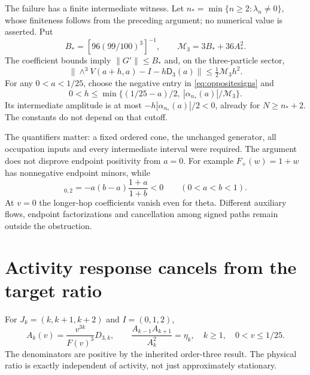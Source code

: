 \documentclass[11pt,letterpaper]{article}
\numberwithin{equation}{section}
\theoremstyle{remark}
\begin{document}
The failure has a finite intermediate witness. Let
$n_* =\min\{n\ge2:\lambda_n\ne0\}$, whose finiteness follows from the
preceding argument; no numerical value is asserted. Put
\begin{equation}
 B_*=[96(99/100)^3]^{-1},\qquad
 \mathcal M_3=3B_*+36A_*^2.
\end{equation}
The coefficient bounds imply $\|G'\|\le B_*$ and, on the three-particle
sector,
\[
 \|\wedge^3V(a+h,a)-I-h\mathsf D_3(a)\|
 \le\tfrac12\mathcal M_3h^2.
\]
For any $0<a<1/25$, choose the negative entry in
\eqref{eq:oppositesigns} and
\begin{equation}
 0<h\le\min\{(1/25-a)/2,\ |\alpha_{n_*}(a)|/\mathcal M_3\}.
 \label{eq:witness}
\end{equation}
Its intermediate amplitude is at most
$-h|\alpha_{n_*}(a)|/2<0$, already for $N\ge n_*+2$.
The constants do not depend on that cutoff.

The quantifiers matter: a fixed ordered cone, the unchanged generator,
all occupation inputs and every intermediate interval were required.
The argument does not disprove endpoint positivity from $a=0$.
For example $F_+(w)=1+w$ has nonnegative endpoint minors, while
\begin{equation}
 [K_bK_a^{-1}]_{0,2}
 =-a(b-a)\frac{1+a}{1+b}<0\qquad(0<a<b<1). \label{eq:bidiagonal}
\end{equation}
At $v=0$ the longer-hop coefficients vanish even for theta. Different
auxiliary flows, endpoint factorizations and cancellation among signed
paths remain outside the obstruction.

\section{Activity response cancels from the target ratio}
\label{sec:activity}
For $J_k=(k,k+1,k+2)$ and $I=(0,1,2)$,
\begin{equation}
 A_k(v)=\frac{v^{3k}}{F(v)^3}D_{3,k},\qquad
 \frac{A_{k-1}A_{k+1}}{A_k^2}=\eta_k,
 \quad k\ge1,\quad 0<v\le1/25. \label{eq:invariant}
\end{equation}
The denominators are positive by the inherited order-three result.
The physical ratio is exactly independent of activity, not just
approximately stationary.
\end{document}
